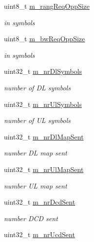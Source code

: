 \begin{DoxyCompactItemize}
uint8\+\_\+t \hyperlink{classns3_1_1BaseStationNetDevice_ac4c3cce8984b95e8c708b0402cc697fc}{m\+\_\+rang\+Req\+Opp\+Size}
\begin{DoxyCompactList}\small\item\em in symbols \end{DoxyCompactList}\item 
uint8\+\_\+t \hyperlink{classns3_1_1BaseStationNetDevice_a15575fd663403b491e36ffe4291ee696}{m\+\_\+bw\+Req\+Opp\+Size}
\begin{DoxyCompactList}\small\item\em in symbols \end{DoxyCompactList}\item 
uint32\+\_\+t \hyperlink{classns3_1_1BaseStationNetDevice_a52d28f1ed36c36d5597ec69118fb0e72}{m\+\_\+nr\+Dl\+Symbols}
\begin{DoxyCompactList}\small\item\em number of DL symbols \end{DoxyCompactList}\item 
uint32\+\_\+t \hyperlink{classns3_1_1BaseStationNetDevice_a56b71612718ada613897e20bd88d924f}{m\+\_\+nr\+Ul\+Symbols}
\begin{DoxyCompactList}\small\item\em number of UL symbols \end{DoxyCompactList}\item 
uint32\+\_\+t \hyperlink{classns3_1_1BaseStationNetDevice_aeaa500ee5b23ee336f2d45af5c8db4da}{m\+\_\+nr\+Dl\+Map\+Sent}
\begin{DoxyCompactList}\small\item\em number DL map sent \end{DoxyCompactList}\item 
uint32\+\_\+t \hyperlink{classns3_1_1BaseStationNetDevice_a00961c496b6d4433e94b417bd86bc241}{m\+\_\+nr\+Ul\+Map\+Sent}
\begin{DoxyCompactList}\small\item\em number UL map sent \end{DoxyCompactList}\item 
uint32\+\_\+t \hyperlink{classns3_1_1BaseStationNetDevice_a69b2562a61cd057e1b2f2288ce88da76}{m\+\_\+nr\+Dcd\+Sent}
\begin{DoxyCompactList}\small\item\em number D\+CD sent \end{DoxyCompactList}\item 
uint32\+\_\+t \hyperlink{classns3_1_1BaseStationNetDevice_aad51b6d3d70d291803d8912d2072d36b}{m\+\_\+nr\+Ucd\+Sent}

\end{DoxyCompactItemize}
